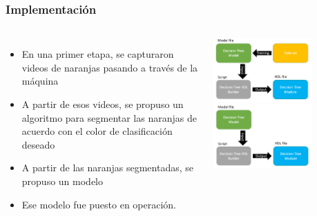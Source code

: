 \frame
{
\frametitle{Implementación}
\begin{columns}
 \begin{itemize}
        \item En una primer etapa, se capturaron videos de naranjas pasando a través de la máquina
        \item A partir de esos videos, se propuso un algoritmo para segmentar las naranjas de acuerdo con el color de clasificación deseado
        \item A partir de las naranjas segmentadas, se propuso un modelo  
        \item Ese modelo fue puesto en operación.
 \end{itemize} 

 \begin{center}
    \includegraphics[width=0.7\textwidth]{Figs/2019_Naranjas_weka_overview1}\\
    \includegraphics[width=0.7\textwidth]{Figs/2019_Naranjas_weka_overview2}
   \end{center}
\end{columns}


}

